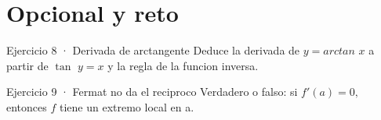 \documentclass[10pt,a4paper,oneside,openany]{book}
\begin{document}
\section*{Opcional y reto}
\begin{PSevenOptionalFixed}{Ejercicio 8 · Derivada de arctangente}
Deduce la derivada de \(y=arctan\) \(x\) a partir de \(\tan\) \(y=x\) y la regla de la funcion inversa.
\end{PSevenOptionalFixed}
\begin{PSevenOptionalFixed}{Ejercicio 9 · Fermat no da el reciproco}
Verdadero o falso: si \(f'(a)=0,\) entonces \(f\) tiene un extremo local en a.
\end{PSevenOptionalFixed}
\end{document}
